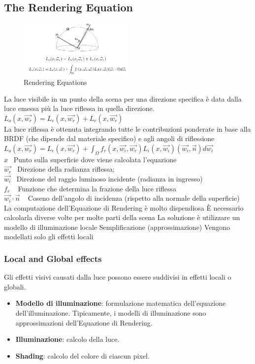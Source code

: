 \subsection{The Rendering Equation}
\begin{figure}[H]
    \centering
    \includegraphics[width=0.5\textwidth]{images/RendEq.png} 
    \caption{Rendering Equations}
    \label{fig:immagine}
\end{figure}
La luce visibile in un punto della scena per una direzione specifica è data dalla luce emessa più la luce riflessa in quella direzione.
\\
$L_o(x,\vec{w_r})=L_e(x,\vec{w_r})+L_r(x,\vec{w_r})$
\\
La luce riflessa è ottenuta integrando tutte le contribuzioni ponderate in base alla BRDF (che dipende dal materiale specifico) e agli angoli di riflessione
$L_o(x,\vec{w_r})=L_e(x,\vec{w_r})+ \int_{\Omega}{}f_r(x,\vec{w_i},\vec{w_r})L_i(x,\vec{w_i})(\vec{w_i},\vec{n})d\vec{w_i}$ \\
$x$ \ Punto sulla superficie dove viene calcolata l'equazione\\
$\vec{w_r}$ \ Direzione della radianza riflessa;\\
$\vec{w_i}$  \ Direzione del raggio luminoso incidente (radianza in ingresso)\\
$f_r$ \ \vspace{10pt} Funzione che determina la frazione della luce riflessa\\
$\vec{w_i}\cdot\vec{n}$  \ \vspace{10pt} Coseno dell'angolo di incidenza (rispetto alla normale della superficie)\\
La computazione dell'Equazione di Rendering è molto dispendiosa
È necessario calcolarla diverse volte per molte parti della scena
La soluzione è utilizzare un modello di illuminazione locale
Semplificazione (approssimazione)
Vengono modellati solo gli effetti locali
\subsubsection{Local and Global effects}
Gli effetti visivi causati dalla luce possono essere suddivisi in effetti locali o globali.
\begin{itemize}
    \item \textbf{Modello di illuminazione}: formulazione matematica dell'equazione dell'illuminazione. Tipicamente, i modelli di illuminazione sono approssimazioni dell'Equazione di Rendering.
    \item \textbf{Illuminazione}: calcolo della luce.
    \item \textbf{Shading}: calcolo del colore di ciascun pixel.
\end{itemize}
